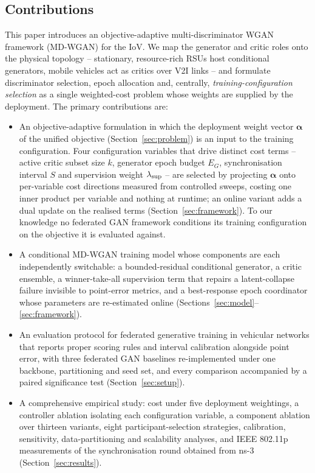 \documentclass[journal]{IEEEtran}
\newcommand{\valpha}{\boldsymbol{\alpha}}
\begin{document}
\subsection{Contributions}
This paper introduces an objective-adaptive multi-discriminator WGAN framework
(MD-WGAN) for the IoV. We map the generator and critic roles onto the physical
topology -- stationary, resource-rich RSUs host conditional generators, mobile
vehicles act as critics over V2I links -- and formulate discriminator selection,
epoch allocation and, centrally, \emph{training-configuration selection} as a
single weighted-cost problem whose weights are supplied by the deployment. The
primary contributions are:
\begin{itemize}
\item An objective-adaptive formulation in which the deployment weight vector
      $\valpha$ of the unified objective (Section~\ref{sec:problem}) is an
      input to the training configuration. Four configuration variables that
      drive distinct cost terms -- active critic subset size $k$, generator
      epoch budget $E_G$, synchronisation interval $S$ and supervision weight
      $\lambda_{\rm sup}$ -- are selected by projecting $\valpha$ onto
      per-variable cost directions measured from controlled sweeps, costing one
      inner product per variable and nothing at runtime; an online variant adds
      a dual update on the realised terms (Section~\ref{sec:framework}).
      To our knowledge no federated GAN framework conditions its training
      configuration on the objective it is evaluated against.
\item A conditional MD-WGAN training model whose components are each
      independently switchable: a bounded-residual conditional generator, a
      critic ensemble, a winner-take-all supervision term that repairs a
      latent-collapse failure invisible to point-error metrics, and a
      best-response epoch coordinator whose parameters are re-estimated online
      (Sections~\ref{sec:model}--\ref{sec:framework}).
\item An evaluation protocol for federated generative training in vehicular
      networks that reports proper scoring rules and interval calibration
      alongside point error, with three federated GAN baselines re-implemented
      under one backbone, partitioning and seed set, and every comparison
      accompanied by a paired significance test (Section~\ref{sec:setup}).
\item A comprehensive empirical study: cost under five deployment weightings,
      a controller ablation isolating each configuration variable, a component
      ablation over thirteen variants, eight participant-selection strategies,
      calibration, sensitivity, data-partitioning and scalability analyses, and
      IEEE 802.11p measurements of the synchronisation round obtained from
      ns-3 (Section~\ref{sec:results}).
\end{itemize}
\end{document}
